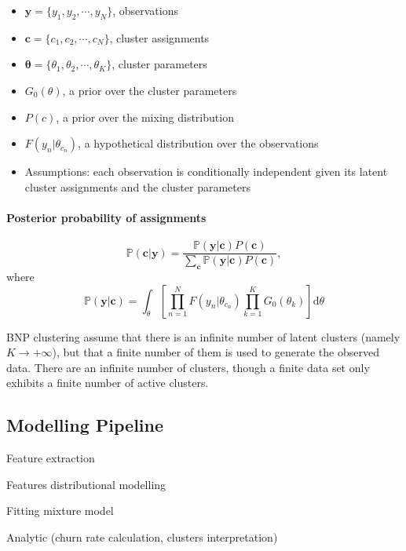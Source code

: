 \begin{itemize}
\item $\mathbf{y} = \{y_1, y_2, \cdots, y_N \}$, observations
\item $\mathbf{c} = \{c_1, c_2, \cdots, c_N \}$, cluster assignments
\item $\bm \theta = \{\theta_1, \theta_2, \cdots, \theta_K \}$, cluster parameters
\item $G_0(\theta)$, a prior over the cluster parameters
\item $P(c)$, a prior over the mixing distribution
\item $F(y_n|\theta_{c_n})$, a hypothetical distribution over the observations
\item Assumptions: each observation is conditionally independent given its latent cluster assignments and the cluster parameters
\end{itemize}

\paragraph{Posterior probability of assignments}

\begin{equation}
\mathbb{P} (\mathbf{c} | \mathbf{y}) = \frac{\mathbb{P}(\mathbf{y} | \mathbf{c}) P(\mathbf{c})}{\sum_{\mathbf{c}} \mathbb{P}(\mathbf{y} | \mathbf{c}) P(\mathbf{c})},
\end{equation}
where
\begin{equation}
\mathbb{P}(\mathbf{y} | \mathbf{c}) = \int_\theta \left[ \prod_{n=1}^N F(y_n | \theta_{c_n}) \prod_{k=1}^K G_0 (\theta_k) \right] \text{d} \theta
\end{equation}


BNP clustering assume that there is an infinite number of latent clusters (namely $K \rightarrow +\infty$), but that a finite number of them is used to generate the observed data. There are an infinite number of clusters, though a finite data set only exhibits a finite number of active clusters.

\subsection{Modelling Pipeline}

Feature extraction

Features distributional modelling

Fitting mixture model

Analytic (churn rate calculation, clusters interpretation)